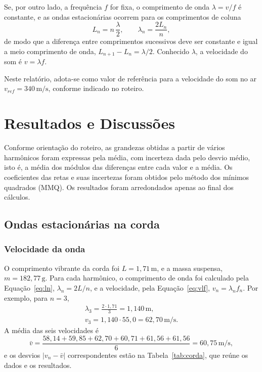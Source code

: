 \documentclass[12pt, a4paper]{article}
\newcommand{\un}[1]{\,\mathrm{#1}}
\begin{document}
Se, por outro lado, a frequência $f$ for fixa, o comprimento de onda $\lambda=v/f$ é constante, e as ondas estacionárias ocorrem para os comprimentos de coluna
\begin{equation}
L_n=n\,\frac{\lambda}{2},
\qquad
\lambda_n=\frac{2L_n}{n},
\label{eq:Ln}
\end{equation}
de modo que a diferença entre comprimentos sucessivos deve ser constante e igual a meio comprimento de onda, $L_{n+1}-L_n=\lambda/2$. Conhecido $\lambda$, a velocidade do som é $v=\lambda f$.

Neste relatório, adota-se como valor de referência para a velocidade do som no ar $v_{ref}=340\un{m/s}$, conforme indicado no roteiro.

\section{Resultados e Discussões}

Conforme orientação do roteiro, as grandezas obtidas a partir de vários harmônicos foram expressas pela média, com incerteza dada pelo desvio médio, isto é, a média dos módulos das diferenças entre cada valor e a média. Os coeficientes das retas e suas incertezas foram obtidos pelo método dos mínimos quadrados (MMQ). Os resultados foram arredondados apenas ao final dos cálculos.

\subsection{Ondas estacionárias na corda}

\subsubsection{Velocidade da onda}

O comprimento vibrante da corda foi $L=1{,}71\un{m}$, e a massa suspensa, $m=182{,}77\un{g}$. Para cada harmônico, o comprimento de onda foi calculado pela Equação~\eqref{eq:ln}, $\lambda_n=2L/n$, e a velocidade, pela Equação~\eqref{eq:vlf}, $v_n=\lambda_nf_n$. Por exemplo, para $n=3$,
\begin{gather*}
\lambda_3=\frac{2\cdot1{,}71}{3}=1{,}140\un{m},\\
v_3=1{,}140\cdot55{,}0=62{,}70\un{m/s}.
\end{gather*}
A média das seis velocidades é
\[
\bar{v}=\frac{58{,}14+59{,}85+62{,}70+60{,}71+61{,}56+61{,}56}{6}=60{,}75\un{m/s},
\]
e os desvios $|v_n-\bar{v}|$ correspondentes estão na Tabela~\ref{tab:corda}, que reúne os dados e os resultados.
\end{document}
